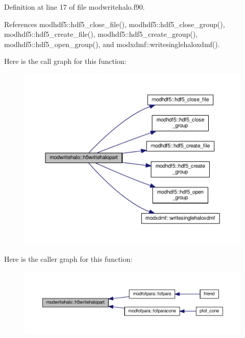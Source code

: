 Definition at line 17 of file modwritehalo.\-f90.



References modhdf5\-::hdf5\-\_\-close\-\_\-file(), modhdf5\-::hdf5\-\_\-close\-\_\-group(), modhdf5\-::hdf5\-\_\-create\-\_\-file(), modhdf5\-::hdf5\-\_\-create\-\_\-group(), modhdf5\-::hdf5\-\_\-open\-\_\-group(), and modxdmf\-::writesinglehaloxdmf().



Here is the call graph for this function\-:\nopagebreak
\begin{figure}[H]
\begin{center}
\leavevmode
\includegraphics[width=350pt]{classmodwritehalo_a8106d4405e4178f9b94b2cf9f850b8bd_cgraph}
\end{center}
\end{figure}




Here is the caller graph for this function\-:\nopagebreak
\begin{figure}[H]
\begin{center}
\leavevmode
\includegraphics[width=350pt]{classmodwritehalo_a8106d4405e4178f9b94b2cf9f850b8bd_icgraph}
\end{center}
\end{figure}


